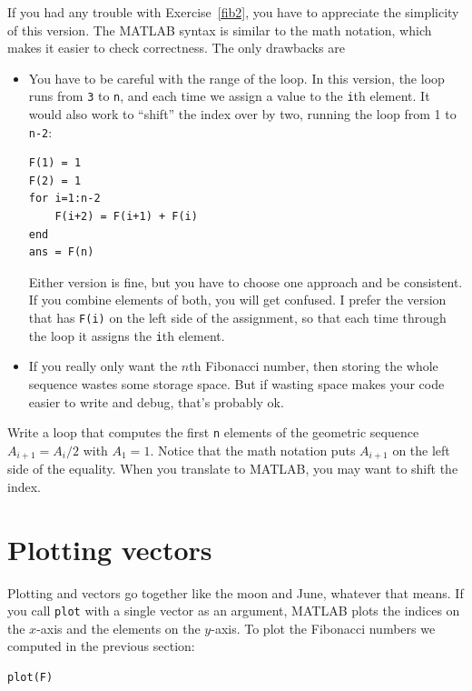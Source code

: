 \documentclass{book}
\begin{document}
If you had any trouble with Exercise~\ref{fib2}, you have to
appreciate the simplicity of this version.  The MATLAB syntax is
similar to the math notation, which makes it easier to check
correctness.  The only drawbacks are

\begin{itemize}

\item You have to be careful with the range of the
loop.  In this version, the loop runs from {\tt 3} to {\tt n},
and each time we assign a value to the {\tt i}th element.  It
would also work to ``shift'' the index over by two,
running the loop from 1 to {\tt n-2}:

\begin{verbatim}
F(1) = 1
F(2) = 1
for i=1:n-2
    F(i+2) = F(i+1) + F(i)
end
ans = F(n)
\end{verbatim}

Either version is fine, but you have to choose one approach
and be consistent.  If you combine elements of both, you will
get confused.  I prefer the version that has {\tt F(i)} on the
left side of the assignment, so that each time through the loop
it assigns the {\tt i}th element.

\item If you really only want the $n$th Fibonacci number, then storing
the whole sequence wastes some storage space.  But if wasting space
makes your code easier to write and debug, that's probably ok.

\end{itemize}

\begin{ex}
Write a loop that computes the first {\tt n} elements
of the geometric sequence $A_{i+1} = A_i/2$ with $A_1 = 1$.  Notice that
the math notation puts $A_{i+1}$ on the left side of the equality.
When you translate to MATLAB, you may want to shift the index.
\end{ex}


\section{Plotting vectors}

Plotting and vectors go together like the moon and June, whatever that
means.  If you call {\tt plot} with a single vector as an argument,
MATLAB plots the indices on the $x$-axis and the elements on the
$y$-axis.  To plot the Fibonacci numbers we computed in the previous
section:

\begin{verbatim}
plot(F)
\end{verbatim}
\end{document}
